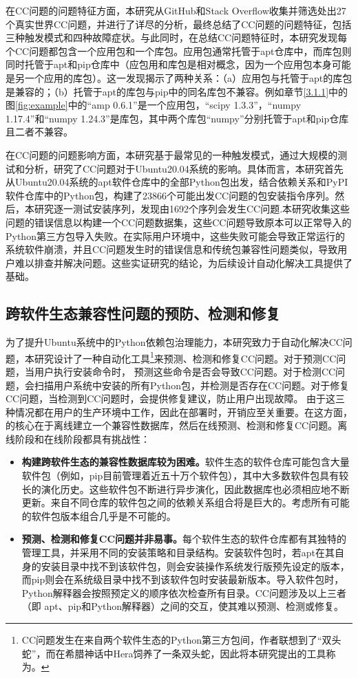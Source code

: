 在CC问题的问题特征方面，本研究从GitHub和Stack Overflow收集并筛选处出27个真实世界CC问题，并进行了详尽的分析，最终总结了CC问题的问题特征，包括三种触发模式和四种故障症状。与此同时，在总结CC问题特征时，本研究发现每个CC问题都包含一个应用包和一个库包。应用包通常托管于apt仓库中，而库包则同时托管于apt和pip仓库中（应包用和库包是相对概念，因为一个应用包本身可能是另一个应用的库包）。这一发现揭示了两种关系：（a）应用包与托管于apt的库包是兼容的；（b）托管于apt的库包与pip中的同名库包不兼容。例如章节\ref{3.1.1}中的图\ref{fig:example}中的“amp 0.6.1”是一个应用包，“scipy 1.3.3”，“numpy 1.17.4”和“numpy 1.24.3”是库包，其中两个库包“numpy”分别托管于apt和pip仓库且二者不兼容。

在CC问题的问题影响方面，本研究基于最常见的一种触发模式，通过大规模的测试和分析，研究了CC问题对于Ubuntu20.04系统的影响。具体而言，本研究首先从Ubuntu20.04系统的apt软件仓库中的全部Python包出发，结合依赖关系和PyPI软件仓库中的Python包，构建了23866个可能出发CC问题的包安装指令序列。然后，本研究逐一测试安装序列，发现由1692个序列会发生CC问题.本研究收集这些问题的错误信息以构建一个CC问题数据集，这些CC问题导致原本可以正常导入的Python第三方包导入失败。在实际用户环境中，这些失败可能会导致正常运行的系统软件崩溃，并且CC问题发生时的错误信息和传统包兼容性问题类似，导致用户难以排查并解决问题。这些实证研究的结论，为后续设计自动化解决工具提供了基础。
\subsection{跨软件生态兼容性问题的预防、检测和修复}
为了提升Ubuntu系统中的Python依赖包治理能力，本研究致力于自动化解决CC问题，本研究设计了一种自动化工具\tool{}\footnote{CC问题发生在来自两个软件生态的Python第三方包间，作者联想到了“双头蛇”，而在希腊神话中Hera饲养了一条双头蛇，因此将本研究提出的工具称为\tool{}。}来预测、检测和修复CC问题。对于预测CC问题，当用户执行安装命令时，\tool{}
预测这些命令是否会导致CC问题。对于检测CC问题，\tool{}会扫描用户系统中安装的所有Python包，并检测是否存在CC问题。对于修复CC问题，当检测到CC问题时，\tool{}会提供修复建议，防止用户出现故障。
由于这三种情况都在用户的生产环境中工作，因此在部署\tool{}时，开销应至关重要。在这方面，\tool{}的核心在于离线建立一个兼容性数据库，然后在线预测、检测和修复CC问题。离线阶段和在线阶段都具有挑战性：
\begin{itemize}
	\item \textbf{构建跨软件生态的兼容性数据库较为困难。}软件生态的软件仓库可能包含大量软件包（例如，pip目前管理着近五十万个软件包），其中大多数软件包具有较长的演化历史。这些软件包不断进行异步演化，因此数据库也必须相应地不断更新。来自不同仓库的软件包之间的依赖关系组合将是巨大的。考虑所有可能的软件包版本组合几乎是不可能的。
	\item\textbf{ 预测、检测和修复CC问题并非易事。}每个软件生态的软件仓库都有其独特的管理工具，并采用不同的安装策略和目录结构。安装软件包时，若apt在其自身的安装目录中找不到该软件包，则会安装操作系统发行版预先设定的版本，而pip则会在系统级目录中找不到该软件包时安装最新版本。导入软件包时，Python解释器会按照预定义的顺序依次检查所有目录。CC问题涉及以上三者（即 apt、pip和Python解释器）之间的交互，使其难以预测、检测或修复。
\end{itemize}


